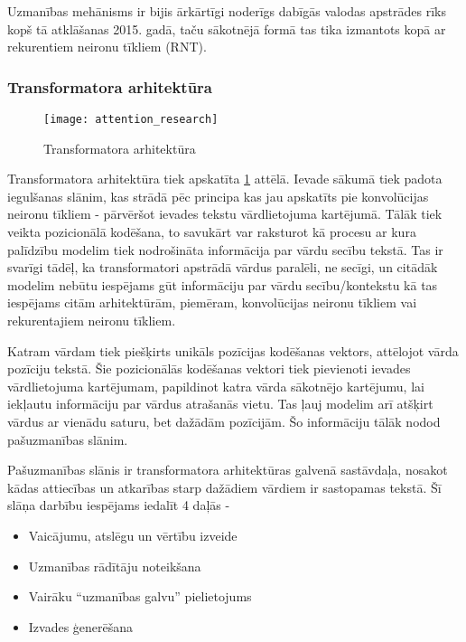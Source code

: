 Uzmanības mehānisms ir bijis ārkārtīgi noderīgs dabīgās valodas apstrādes rīks kopš tā atklāšanas 2015. gadā, taču sākotnējā formā tas tika izmantots kopā ar rekurentiem neironu tīkliem (RNT). 

\subsubsection{Transformatora arhitektūra}

\begin{figure}[H]
	\texttt{[image: attention\_research]}
	\caption{Transformatora arhitektūra \cite{vaswani2023attention} }
	\label{fig:vaswani2023attention_img}
\end{figure}

Transformatora arhitektūra tiek apskatīta \ref{fig:vaswani2023attention_img} attēlā. Ievade sākumā tiek padota iegulšanas slānim, kas strādā pēc principa kas jau apskatīts pie konvolūcijas neironu tīkliem - pārvēršot ievades tekstu vārdlietojuma kartējumā. Tālāk tiek veikta pozicionālā kodēšana, to savukārt var raksturot kā procesu ar kura palīdzību modelim tiek nodrošināta informācija par vārdu secību tekstā. Tas ir svarīgi tādēļ, ka transformatori apstrādā vārdus paralēli, ne secīgi, un citādāk modelim nebūtu iespējams gūt informāciju par vārdu secību/kontekstu kā tas iespējams citām arhitektūrām, piemēram, konvolūcijas neironu tīkliem vai rekurentajiem neironu tīkliem.

Katram vārdam tiek piešķirts unikāls pozīcijas  kodēšanas vektors, attēlojot vārda pozīciju tekstā. Šie pozicionālās kodēšanas vektori tiek pievienoti ievades vārdlietojuma kartējumam, papildinot katra vārda sākotnējo kartējumu, lai iekļautu informāciju par vārdus atrašanās vietu. Tas ļauj modelim arī atšķirt vārdus ar vienādu saturu, bet dažādām pozīcijām. Šo informāciju tālāk nodod pašuzmanības slānim.

Pašuzmanības slānis ir transformatora arhitektūras galvenā sastāvdaļa, nosakot kādas attiecības un atkarības starp dažādiem vārdiem ir sastopamas tekstā. Šī slāņa darbību iespējams iedalīt 4 daļās - 
\begin{itemize}
\item Vaicājumu, atslēgu un vērtību izveide
\item Uzmanības rādītāju noteikšana
\item Vairāku “uzmanības galvu” pielietojums
\item Izvades ģenerēšana
\end{itemize}


